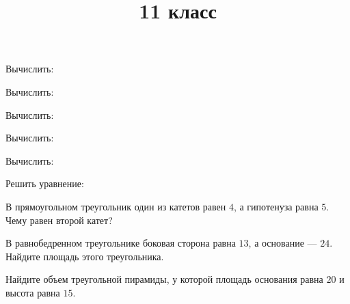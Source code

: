 \title{11 класс}
\begin{listofex}
	\item Вычислить:
	\begin{enumcols}[itemcolumns=3]
		\item {}
		\item {}
		\item {}
		\item {}
	\end{enumcols}
	\item Вычислить:
	\begin{enumcols}[itemcolumns=3]
		\item {}
		\item {}
		\item {}
		\item {}
		\item {}
	\end{enumcols}
	\item Вычислить:
	\begin{enumcols}[itemcolumns=3]
		\item {}
		\item {}
		\item {}
		\item {}
		\item {}
	\end{enumcols}
	\item Вычислить:
	\begin{enumcols}[itemcolumns=3]
		\item {}
		\item {}
		\item {}
	\end{enumcols}
	\item Вычислить:
	\begin{enumcols}[itemcolumns=2]
		\item {}
		\item {}
	\end{enumcols}
	\item Решить уравнение:
	\begin{enumcols}[itemcolumns=4]
		\item {}
		\item {}
		\item {}
		\item {}
	\end{enumcols}
	\item В прямоугольном треугольник один из катетов равен \( 4 \), а гипотенуза равна \( 5 \). Чему равен второй катет?
	\item В равнобедренном треугольнике боковая сторона равна \( 13 \), а основание --- \( 24 \). Найдите площадь этого треугольника.
	\item Найдите объем треугольной пирамиды, у которой площадь основания равна \( 20 \) и высота равна \( 15 \).
\end{listofex}
